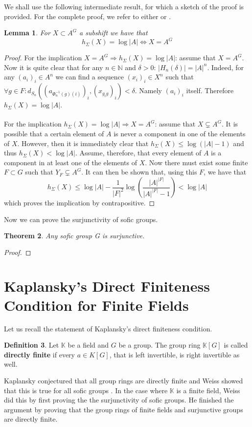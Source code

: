 \documentclass[titlepage, a4paper]{article}
\newcommand{\N}{\mathbb{N}}
\theoremstyle{theoremdd}
\newtheorem{theorem}{Theorem}[section]
\newtheorem{lemma}[theorem]{Lemma}
\theoremstyle{definition}
\newtheorem{definition}[theorem]{Definition}
\theoremstyle{remark}
\begin{document}
We shall use the following intermediate result, for which a sketch of the proof is provided. For the complete proof, we refer to either \cite[paragraph 2.13.7]{capraro_lupini_2015} or \cite[theorem 4.12]{kerr_li_2010}.

\begin{lemma}
For $X \subset A^G$ a subshift we have that 
		\[
		h_\Sigma(X) = \log |A| \Leftrightarrow X = A^G
		\]
\end{lemma}
\begin{proof}
For the implication $X = A^G \Rightarrow h_\Sigma(X) = \log |A|$: assume that $X = A^G$. Now it is quite clear that for any $n \in \N$ and $\delta > 0$: $|H_n(\delta)| = |A|^n$. Indeed, for any $(a_i)_i \in A^n$ we can find a sequence $(x_i)_i \in X^n$ such that $\forall g \in F: d_{S_n}((a_{\Phi^{-1}_n(g)(i)})_i,(x_{g_i g})_i) < \delta$. Namely  $(a_i)_i$ itself. Therefore $h_\Sigma(X) = \log |A|$.\\
\\
For the implication $h_\Sigma(X) = \log |A| \Rightarrow X = A^G$: assume that $X \varsubsetneq A^G$. It is possible that a certain element of $A$ is never a component in one of the elements of $X$. However, then it is immediately clear that $h_\Sigma(X) \leq \log (|A|-1) $ and thus $h_\Sigma(X) < \log |A|$. Assume, therefore, that every element of $A$ is a component in at least one of the elements of $X$. Now there must exist some finite $F \subset G$ such that $Y_F \varsubsetneq A^G$. It can then be shown that, using this $F$, we have that
		\[
		h_\Sigma(X) \leq \log |A| - \frac{1}{|F|^2} \log \left(\frac{|A|^{|F|}}{|A|^{|F|} - 1}\right) < \log |A|
		\]
which proves the implication by contrapositive. 
\end{proof}

Now we can prove the surjunctivity of sofic groups.

\begin{theorem}
Any sofic group G is surjunctive.
\end{theorem}
\begin{proof}

\end{proof}

	\section{Kaplansky's Direct Finiteness Condition for Finite Fields}
	Let us recall the statement of Kaplansky's direct finiteness condition.
	\begin{definition}
		Let $\mathbb K$ be a field and $G$ be a group. The group ring $\mathbb K[G]$ is called \textbf{directly finite} if every  $a \in K[G]$, that is left invertible, is right invertible as well. 
		
	\end{definition}
	Kaplansky conjectured that all group rings are directly finite and Weiss showed that this is true for all sofic groups \cite[section 3, section 4]{weiss_2000}. 
	In the case where $\mathbb K$ is a finite field, Weiss did this by first proving the the surjunctivity of sofic groups.
	He finished the argument by proving that the group rings of finite fields and surjunctive groups are directly finite.  
\end{document}
